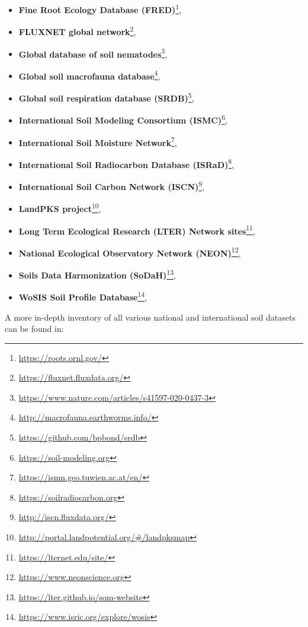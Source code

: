 \documentclass[
  graybox,natbib,nospthms]{svmono}
\providecommand{\tightlist}{%
  \setlength{\itemsep}{0pt}\setlength{\parskip}{0pt}}
\providecommand{\tightlist}{\setlength{\itemsep}{0pt}\setlength{\parskip}{0pt}}
\renewcommand{\href}[2]{#2 (\url{#1})}
\renewcommand{\href}[2]{#2\footnote{\url{#1}}}
\begin{document}
\begin{itemize}
\tightlist
\item
  \href{https://roots.ornl.gov/}{\textbf{Fine Root Ecology Database (FRED)}},\\
\item
  \href{https://fluxnet.fluxdata.org/}{\textbf{FLUXNET global network}},\\
\item
  \href{https://www.nature.com/articles/s41597-020-0437-3}{\textbf{Global database of soil nematodes}},\\
\item
  \href{http://macrofauna.earthworms.info/}{\textbf{Global soil macrofauna database}},\\
\item
  \href{https://github.com/bpbond/srdb}{\textbf{Global soil respiration database (SRDB)}},\\
\item
  \href{https://soil-modeling.org}{\textbf{International Soil Modeling Consortium (ISMC)}},\\
\item
  \href{https://ismn.geo.tuwien.ac.at/en/}{\textbf{International Soil Moisture Network}},\\
\item
  \href{https://soilradiocarbon.org}{\textbf{International Soil Radiocarbon Database (ISRaD)}},\\
\item
  \href{http://iscn.fluxdata.org/}{\textbf{International Soil Carbon Network (ISCN)}},\\
\item
  \href{http://portal.landpotential.org/\#/landpksmap}{\textbf{LandPKS project}},\\
\item
  \href{https://lternet.edu/site/}{\textbf{Long Term Ecological Research (LTER) Network sites}},\\
\item
  \href{https://www.neonscience.org}{\textbf{National Ecological Observatory Network (NEON)}},\\
\item
  \href{https://lter.github.io/som-website}{\textbf{Soils Data Harmonization (SoDaH)}},\\
\item
  \href{https://www.isric.org/explore/wosis}{\textbf{WoSIS Soil Profile Database}},
\end{itemize}

A more in-depth inventory of all various national and international soil datasets can be found in:
\end{document}
